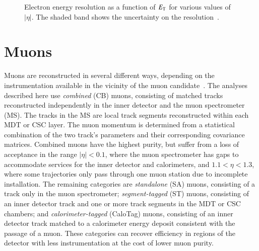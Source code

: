 \begin{figure}[htbp]
{	}
	\hfill
	\caption[Electron energy resolution as a function of $\ET$ for various values of $|\eta|$. The shaded band shows the uncertainty on the resolution.]{Electron energy resolution as a function of $\ET$ for various values of $|\eta|$. The shaded band shows the uncertainty on the resolution~\cite{TheATLASCollaboration:2014gf}.}
	\label{fig:reco-el-EER}
\end{figure}

\section{Muons}\label{sec:event-reconstruction-muons}
Muons are reconstructed in several different ways, depending on the instrumentation available in the vicinity of the muon candidate~\cite{TheATLASCollaboration:2014bm}. The analyses described here use \emph{combined} (CB) muons, consisting of matched tracks reconstructed independently in the inner detector and the muon spectrometer (MS). The tracks in the MS are local track segments reconstructed within each MDT or CSC layer. The muon momentum is determined from a statistical combination of the two track's parameters and their corresponding covariance matrices. Combined muons have the highest purity, but suffer from a loss of acceptance in the range $|\eta|<0.1$, where the muon spectrometer has gaps to accommodate services for the inner detector and calorimeters, and $1.1<\eta<1.3$, where some trajectories only pass through one muon station due to incomplete installation. The remaining categories are \emph{standalone} (SA) muons, consisting of a track only in the muon spectrometer; \emph{segment-tagged} (ST) muons, consisting of an inner detector track and one or more track segments in the MDT or CSC chambers; and \emph{calorimeter-tagged} (CaloTag) muons, consisting of an inner detector track matched to a calorimeter energy deposit consistent with the passage of a muon. These categories can recover efficiency in regions of the detector with less instrumentation at the cost of lower muon purity. 

